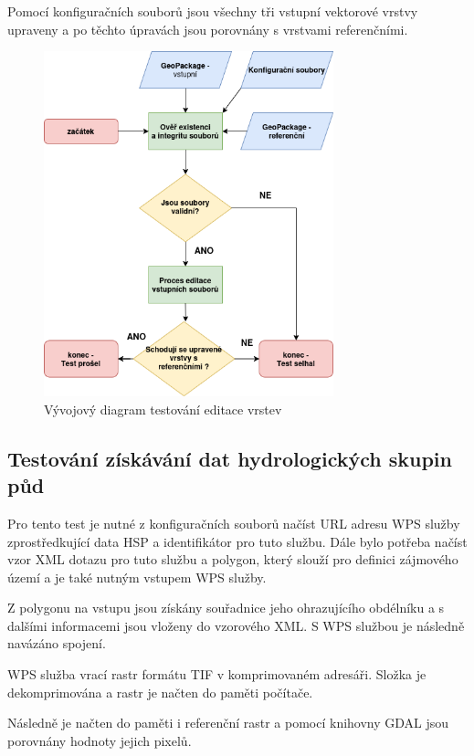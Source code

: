 \documentclass[a4paper,oneside,12pt]{book}
\begin{document}
\hspace{10mm} Pomocí konfiguračních souborů jsou všechny tři vstupní vektorové vrstvy upraveny a po těchto úpravách jsou porovnány s vrstvami referenčními. 

\begin{figure}[H] \label{obr19}
\centering
\includegraphics[height=10cm]{pictures/test2.png}
\caption{Vývojový diagram testování editace vrstev}
\label{fig:test2}
\end{figure}


\subsection{Testování získávání dat hydrologických skupin půd} \label{test_soil}
\hspace{10mm} Pro tento test je nutné z konfiguračních souborů načíst URL adresu WPS služby zprostředkující data HSP a identifikátor pro tuto službu. Dále bylo potřeba načíst vzor XML dotazu pro tuto službu a polygon, který slouží pro definici zájmového území a je také nutným vstupem WPS služby.

\hspace{10mm} Z polygonu na vstupu jsou získány souřadnice jeho ohrazujícího obdélníku a s dalšími informacemi jsou vloženy do vzorového XML. S WPS službou je následně navázáno spojení.

\hspace{10mm} WPS služba vrací rastr formátu TIF v komprimovaném adresáři. Složka je dekomprimována a rastr je načten do paměti počítače.

\hspace{10mm} Následně je načten do paměti i referenční rastr a pomocí knihovny GDAL jsou porovnány hodnoty jejich pixelů.
\end{document}

